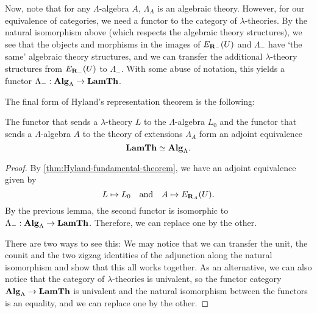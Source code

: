 \begin{remark}
  Now, note that for any $ \Lambda $-algebra $ A $, $ \Lambda_A $ is an algebraic theory. However, for our equivalence of categories, we need a functor to the category of $ \lambda $-theories. By the natural isomorphism above (which respects the algebraic theory structures), we see that the objects and morphisms in the images of $ E_{\mathbf{R}_-}(U) $ and $ \Lambda_- $ have `the same' algebraic theory structures, and we can transfer the additional $ \lambda $-theory structures from $ E_{\mathbf{R}_-}(U) $ to $ \Lambda_- $. With some abuse of notation, this yields a functor $ \Lambda_- : \mathbf{Alg}_{\Lambda} \to \mathbf{LamTh} $.
\end{remark}

The final form of Hyland's representation theorem is the following:
\begin{theorem}\label{thm:final-fundamental-theorem}
  The functor that sends a $ \lambda $-theory $ L $ to the $ \Lambda $-algebra $ L_0 $ and the functor that sends a $ \Lambda $-algebra $ A $ to the theory of extensions $ \Lambda_A $ form an adjoint equivalence
  \[ \mathbf{LamTh} \simeq \mathbf{Alg}_{\Lambda}. \]
\end{theorem}
\begin{proof}
  By \ref{thm:Hyland-fundamental-theorem}, we have an adjoint equivalence given by
  \[ L \mapsto L_0 \quad \text{and} \quad A \mapsto E_{\mathbf{R}_A}(U). \]
  By the previous lemma, the second functor is isomorphic to $ \Lambda_-: \mathbf{Alg}_{\Lambda} \to \mathbf{LamTh} $. Therefore, we can replace one by the other.

  There are two ways to see this: We may notice that we can transfer the unit, the counit and the two zigzag identities of the adjunction along the natural isomorphism and show that this all works together. As an alternative, we can also notice that the category of $ \lambda $-theories is univalent, so the functor category $ \mathbf{Alg}_{\Lambda} \to \mathbf{LamTh} $ is univalent and the natural isomorphism between the functors is an equality, and we can replace one by the other.
\end{proof}
